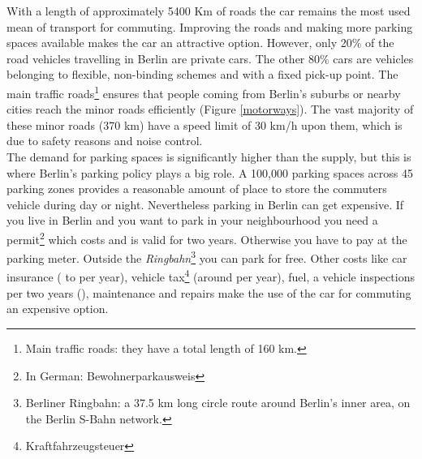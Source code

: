 With a length of approximately 5400 Km of roads the car remains the most used mean of transport for commuting. Improving the roads and making more parking spaces available makes the car an attractive option. However, only 20\% of the road vehicles travelling in Berlin are private cars. The other 80\% cars are vehicles belonging to flexible, non-binding schemes and with a fixed pick-up point.  The main traffic roads\footnote{Main traffic roads: they have a total length of 160 km.} ensures that people coming from Berlin's suburbs or nearby cities reach the minor roads efficiently (Figure \ref{motorways}). The vast majority of these minor roads (370 km) have a speed limit of 30 km/h upon them, which is due to safety reasons and noise control\cite{MobilityCity}. \\ \newline
The demand for parking spaces is significantly higher than the supply, but this is where Berlin's parking policy plays a big role. A 100,000 parking spaces across 45 parking zones provides a reasonable amount of place to store the commuters vehicle during day or night. Nevertheless parking in Berlin can get expensive. If you live in Berlin and you want to park in your neighbourhood you need a permit\footnote{In German: Bewohnerparkausweis} which costs  and is valid for two years. Otherwise you have to pay at the parking meter. Outside the \textit{Ringbahn}\footnote{Berliner Ringbahn: a 37.5 km long circle route around Berlin's inner area, on the Berlin S-Bahn network.} you can park for free. Other costs like car insurance ( to  per year), vehicle tax\footnote{Kraftfahrzeugsteuer} (around  per year), fuel, a vehicle inspections per two years (), maintenance and repairs make the use of the car for commuting an expensive option\cite{CostCars}.

